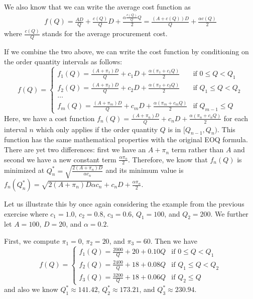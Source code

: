 \begin{solution}
We also know that we can write the average cost function as 
\begin{align*}
f(Q) = \frac{AD}{Q} + \frac{c(Q)}{Q} D + \frac{\alpha \frac{c(Q)}{Q}Q}{2} = \frac{(A+c(Q))D}{Q} + \frac{\alpha c(Q)}{2} 
\end{align*}
where $\frac{c(Q)}{Q}$ stands for the average procurement cost. 

If we combine the two above, we can write the cost function by conditioning on the order quantity intervals as follows:
\begin{equation*}
f(Q) = 
\begin{cases}
f_1(Q) = \frac{(A+\pi_1)D}{Q} + c_1 D + \frac{\alpha (\pi_1 + c_1 Q)}{2} & \text{if } 0 \leq Q < Q_1 \\
f_2(Q) = \frac{(A+\pi_2)D}{Q} + c_2 D + \frac{\alpha (\pi_2 + c_2 Q)}{2} & \text{if } Q_1 \leq Q < Q_2 \\
\ldots \\
f_m(Q) = \frac{(A+\pi_m)D}{Q} + c_m D + \frac{\alpha (\pi_m + c_m Q)}{2} & \text{if } Q_{m-1} \leq Q 
\end{cases}
\end{equation*}
Here, we have a cost function $f_n(Q) = \frac{(A+\pi_n)D}{Q} + c_n D + \frac{\alpha (\pi_n + c_n Q)}{2}$ for each interval $n$ which only applies if the order quantity $Q$ is in $[Q_{n-1},Q_n)$. This function has the same mathematical properties with the original EOQ formula. There are yet two differences: first we have an $A+\pi_n$ term rather than $A$ and second we have a new constant term $\frac{\alpha \pi_n}{2}$. Therefore, we know that $f_n(Q)$ is minimized at $Q^*_n=\sqrt{\frac{2(A+\pi_n)D}{\alpha c_n}}$ and its minimum value is $f_n(Q^*_n)=\sqrt{2(A+\pi_n)D\alpha c_n}+c_n D+\frac{\alpha \pi_n}{2}$.

Let us illustrate this by once again considering the example from the previous exercise where $c_1=1.0$, $c_2=0.8$, $c_3=0.6$, $Q_1=100$, and $Q_2=200$. We further let $A=100$, $D=20$, and $\alpha=0.2$. 

First, we compute $\pi_1=0$, $\pi_2=20$, and $\pi_3=60$. Then we have
\begin{equation*}
f(Q) = 
\begin{cases}
f_1(Q) = \frac{2000}{Q} + 20 + 0.10 Q & \text{if } 0 \leq Q < Q_1 \\
f_2(Q) = \frac{2400}{Q} + 18 + 0.08 Q & \text{if } Q_1 \leq Q < Q_2 \\
f_3(Q) = \frac{3200}{Q} + 18 + 0.06 Q & \text{if } Q_{2} \leq Q 
\end{cases}
\end{equation*}
and also we know $Q^*_1\approx 141.42$, $Q^*_2\approx 173.21$, and $Q^*_3\approx 230.94$. 


\end{solution}
